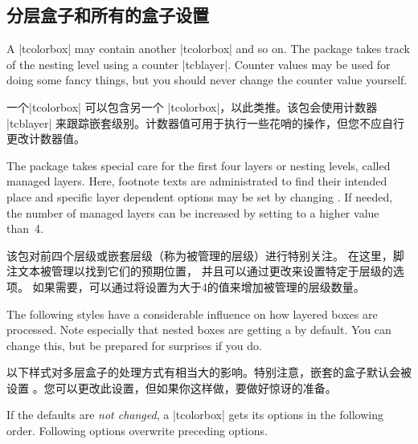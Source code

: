\subsection{分层盒子和所有的盒子设置}\label{subsec:everybox}

A |tcolorbox| may contain another |tcolorbox| and so on. The package
takes track of the nesting level using a counter |tcblayer|. Counter values
may be used for doing some fancy things, but you should never change
the counter value yourself.

一个|tcolorbox| 可以包含另一个 |tcolorbox|，以此类推。该包会使用计数器 |tcblayer| 来跟踪嵌套级别。计数器值可用于执行一些花哨的操作，但您不应自行更改计数器值。


The package takes special care for the first four layers or nesting levels,
called managed layers.
Here, footnote texts are administrated to find their intended place
and specific layer dependent options may be set by changing
.
If needed, the number of managed layers can be increased by setting
 to a higher value than~4.

该包对前四个层级或嵌套层级（称为被管理的层级）进行特别关注。 在这里，脚注文本被管理以找到它们的预期位置， 并且可以通过更改来设置特定于层级的选项。 如果需要，可以通过将设置为大于4的值来增加被管理的层级数量。



The following styles have a considerable influence on how layered boxes
are processed. Note especially that nested boxes are getting a
 by default. You can change this, but be prepared for
surprises if you do.

以下样式对多层盒子的处理方式有相当大的影响。特别注意，嵌套的盒子默认会被设置  。您可以更改此设置，但如果你这样做，要做好惊讶的准备。

If the defaults are \emph{not changed}, a |tcolorbox| gets its options
in the following order. Following options overwrite preceding options.

